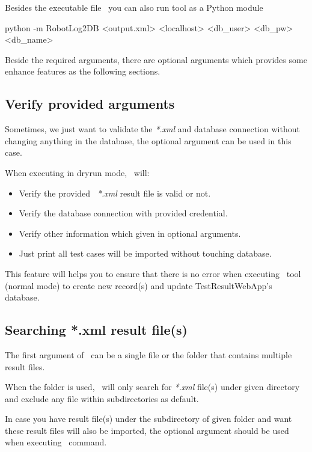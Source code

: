     Besides the executable file \pkg\, you can also run tool as a Python module
\begin{robotlog}
python -m RobotLog2DB <output.xml> <localhost> <db\_user> <db\_pw> <db\_name>
\end{robotlog}

    Beside the required arguments, there are optional arguments which provides
    some enhance features as the following sections.

  \subsection{Verify provided arguments}
    Sometimes, we just want to validate the \emph{*.xml} and database connection
    without changing anything in the database, the optional argument
     can be used in this case.

    When executing in dryrun mode, \pkg\ will:

    \begin{itemize}
    \tightlist
    \item
      Verify the provided \rfwcore\ \emph{*.xml} result file is valid or not.
    \item
      Verify the database connection with provided credential.
    \item
      Verify other information which given in optional arguments.
    \item
      Just print all test cases will be imported without touching database.
    \end{itemize}

    This feature will helps you to ensure that there is no error when
    executing \pkg\ tool (normal mode) to create new record(s) and
    update TestResultWebApp's database.

  \subsection{Searching *.xml result file(s)}
    The first argument  of \pkg\ can be a single file or the
    folder that contains multiple result files.

    When the folder is used, \pkg\ will only search for \emph{*.xml} file(s)
    under given directory and exclude any file within subdirectories as default.

    In case you have result file(s) under the subdirectory of given folder and
    want these result files will also be imported, the optional argument
     should be used when executing \pkg\ command.

